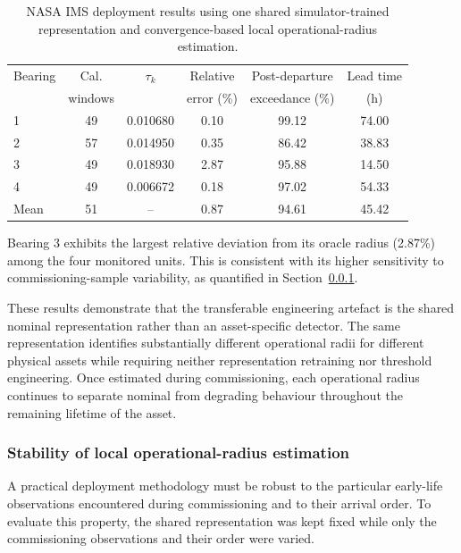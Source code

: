\documentclass{trbunofficial}
\begin{document}
\begin{table}[!ht]
\centering
\caption{NASA IMS deployment results using one shared simulator-trained
representation and convergence-based local operational-radius estimation.}
\label{tab:nasa-main-results}

\begin{tabular}{@{}lccccc@{}}
\toprule
Bearing & Cal.    & $\tau_k$ & Relative   & Post-departure & Lead time \\
        & windows &          & error (\%) & exceedance (\%) & (h)       \\
\midrule
1 & 49 & 0.010680 & 0.10 & 99.12 & 74.00 \\
2 & 57 & 0.014950 & 0.35 & 86.42 & 38.83 \\
3 & 49 & 0.018930 & 2.87 & 95.88 & 14.50 \\
4 & 49 & 0.006672 & 0.18 & 97.02 & 54.33 \\
\midrule
Mean & 51 & -- & 0.87 & 94.61 & 45.42 \\
\bottomrule
\end{tabular}
\end{table}
Bearing 3 exhibits the largest relative deviation from its oracle radius
(2.87\%) among the four monitored units. This is consistent with its
higher sensitivity to commissioning-sample variability, as quantified in
Section~\ref{sec:nasa-stability-sec}.

These results demonstrate that the transferable engineering artefact is the shared nominal representation rather than an asset-specific detector.
The same representation identifies substantially different operational radii for different physical assets while requiring neither representation retraining nor threshold engineering.
Once estimated during commissioning, each operational radius continues to separate nominal from degrading behaviour throughout the remaining lifetime of the asset.

\subsubsection{Stability of local operational-radius estimation}
\label{sec:nasa-stability-sec}
A practical deployment methodology must be robust to the particular
early-life observations encountered during commissioning and to their
arrival order. To evaluate this property, the shared representation was kept
fixed while only the commissioning observations and their order were varied.
\end{document}
